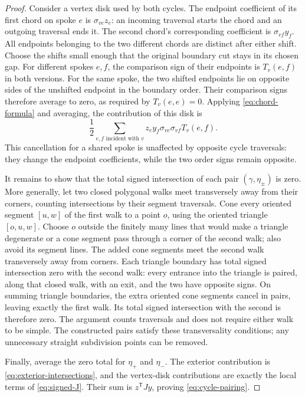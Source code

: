 \begin{proof}
Consider a vertex disk used by both cycles.  The endpoint coefficient
of its first chord on spoke $e$ is $\sigma_{ve}z_e$: an incoming
traversal starts the chord and an outgoing traversal ends it.  The
second chord's corresponding coefficient is $\sigma_{vf}y_f$.
All endpoints belonging to the two different chords are distinct
after either shift.  Choose the shifts small enough that the original
boundary cut stays in its chosen gap.  For different spokes $e,f$,
the comparison sign of their endpoints is $T_v(e,f)$ in both versions.
For the same spoke, the two shifted endpoints lie on opposite sides
of the unshifted endpoint in the boundary order.  Their comparison
signs therefore average to zero, as required by $T_v(e,e)=0$.
Applying \eqref{eq:chord-formula} and averaging, the contribution of
this disk is
\[
 \frac12\sum_{e,f\text{ incident with }v}
       z_e y_f\sigma_{ve}\sigma_{vf}T_v(e,f).
\]
This cancellation for a shared spoke is unaffected by opposite cycle
traversals: they change the endpoint coefficients, while the two order
signs remain opposite.

It remains to show that the total signed intersection of each pair
$(\gamma,\eta_\pm)$ is zero.  More generally, let two closed polygonal
walks meet transversely away from their corners, counting intersections
by their segment traversals.  Cone every oriented segment $[u,w]$ of
the first walk to a point $o$, using the oriented triangle $[o,u,w]$.
Choose $o$ outside the finitely many lines that would make a triangle
degenerate or a cone segment pass through a corner of the second walk;
also avoid its segment lines.  The added cone segments meet the second
walk transversely away from corners.  Each triangle boundary has total
signed intersection zero with the second walk: every entrance into
the triangle is paired, along that closed walk, with an exit, and the
two have opposite signs.  On summing triangle boundaries, the extra
oriented cone segments cancel in pairs, leaving exactly the first
walk.  Its total signed intersection with the second is therefore
zero.  The argument counts traversals and does not require either walk
to be simple.  The constructed pairs satisfy these transversality
conditions; any unnecessary straight subdivision points can be removed.

Finally, average the zero total for $\eta_+$ and $\eta_-$.  The exterior
contribution is \eqref{eq:exterior-intersections}, and the vertex-disk
contributions are exactly the local terms of \eqref{eq:signed-J}.
Their sum is $z^{\mathsf T}Jy$, proving \eqref{eq:cycle-pairing}.
\end{proof}

